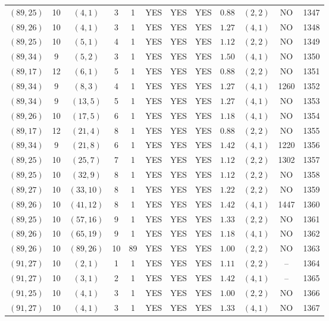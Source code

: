 \begin{longtable}{|c|c|c|c|c|c|c|c|c|c|c|c|}
$(89,25)$ & 10 & $(4,1)$ & 3 & 1 & YES & YES & YES & $0.88$ & $(2,2)$ & NO & 1347\\
$(89,26)$ & 10 & $(4,1)$ & 3 & 1 & YES & YES & YES & $1.27$ & $(4,1)$ & NO & 1348\\
$(89,25)$ & 10 & $(5,1)$ & 4 & 1 & YES & YES & YES & $1.12$ & $(2,2)$ & NO & 1349\\
$(89,34)$ & 9 & $(5,2)$ & 3 & 1 & YES & YES & YES & $1.50$ & $(4,1)$ & NO & 1350\\
$(89,17)$ & 12 & $(6,1)$ & 5 & 1 & YES & YES & YES & $0.88$ & $(2,2)$ & NO & 1351\\
$(89,34)$ & 9 & $(8,3)$ & 4 & 1 & YES & YES & YES & $1.27$ & $(4,1)$ & 1260 & 1352\\
$(89,34)$ & 9 & $(13,5)$ & 5 & 1 & YES & YES & YES & $1.27$ & $(4,1)$ & NO & 1353\\
$(89,26)$ & 10 & $(17,5)$ & 6 & 1 & YES & YES & YES & $1.18$ & $(4,1)$ & NO & 1354\\
$(89,17)$ & 12 & $(21,4)$ & 8 & 1 & YES & YES & YES & $0.88$ & $(2,2)$ & NO & 1355\\
$(89,34)$ & 9 & $(21,8)$ & 6 & 1 & YES & YES & YES & $1.42$ & $(4,1)$ & 1220 & 1356\\
$(89,25)$ & 10 & $(25,7)$ & 7 & 1 & YES & YES & YES & $1.12$ & $(2,2)$ & 1302 & 1357\\
$(89,25)$ & 10 & $(32,9)$ & 8 & 1 & YES & YES & YES & $1.12$ & $(2,2)$ & NO & 1358\\
$(89,27)$ & 10 & $(33,10)$ & 8 & 1 & YES & YES & YES & $1.22$ & $(2,2)$ & NO & 1359\\
$(89,26)$ & 10 & $(41,12)$ & 8 & 1 & YES & YES & YES & $1.42$ & $(4,1)$ & 1447 & 1360\\
$(89,25)$ & 10 & $(57,16)$ & 9 & 1 & YES & YES & YES & $1.33$ & $(2,2)$ & NO & 1361\\
$(89,26)$ & 10 & $(65,19)$ & 9 & 1 & YES & YES & YES & $1.18$ & $(4,1)$ & NO & 1362\\
$(89,26)$ & 10 & $(89,26)$ & 10 & 89 & YES & YES & YES & $1.00$ & $(2,2)$ & NO & 1363\\
$(91,27)$ & 10 & $(2,1)$ & 1 & 1 & YES & YES & YES & $1.11$ & $(2,2)$ & -- & 1364\\
$(91,27)$ & 10 & $(3,1)$ & 2 & 1 & YES & YES & YES & $1.42$ & $(4,1)$ & -- & 1365\\
$(91,25)$ & 10 & $(4,1)$ & 3 & 1 & YES & YES & YES & $1.00$ & $(2,2)$ & NO & 1366\\
$(91,27)$ & 10 & $(4,1)$ & 3 & 1 & YES & YES & YES & $1.33$ & $(4,1)$ & NO & 1367\\

\end{longtable}
